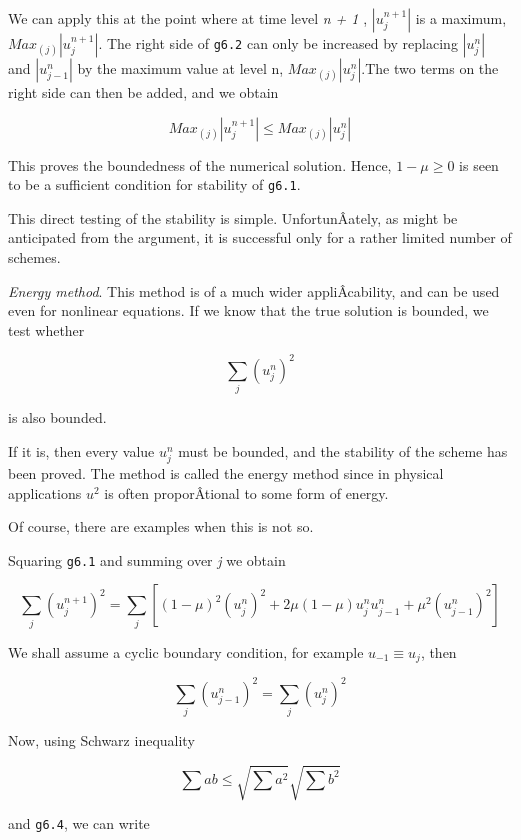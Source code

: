 We can apply this at the point where at time level \emph{n + 1} ,
\(\left| u_{j}^{n + 1} \right|\) is a maximum,
\({Max}_{(j)} \left | u_{j}^{n + 1} \right|\). The right side of
\texttt{g6.2} can only be increased by replacing
\(\left| u_{j}^{n} \right|\) and \(\left| u_{j-1}^{n} \right|\) by the
maximum value at level n, \({Max}_{(j)} \left| u_{j}^{n} \right|\).The
two terms on the right side can then be added, and we obtain

\[{Max}_{(j)} \left| u_{j}^{n + 1} \right| \leq {Max}_{(j)}\left| u_{j}^{n} \right|\]

This proves the boundedness of the numerical solution. Hence,
\(1 - \mu \geq 0\) is seen to be a sufficient condition for stability of
\texttt{g6.1}.

This direct testing of the stability is simple. UnfortunÂ­ately, as might
be anticipated from the argument, it is successful only for a rather
limited number of schemes.

\emph{Energy method}. This method is of a much wider appliÂ­cability, and
can be used even for nonlinear equations. If we know that the true
solution is bounded, we test whether

\[{\sum_{j}^{}\left( u_{j}^{n} \right)}^{2}\]

is also bounded.

If it is, then every value \(u_{j}^{n}\) must be bounded, and the
stability of the scheme has been proved. The method is called the energy
method since in physical applications \(u^{2}\) is often proporÂ­tional
to some form of energy.

Of course, there are examples when this is not so.

Squaring \texttt{g6.1} and summing over \emph{j} we obtain

    \[{\sum_{j}^{}\left( u_{j}^{n + 1} \right)}^{2} =
\sum_{j}^{}\left\lbrack \left( 1 - \mu \right)^{2}\left( u_{j}^{n} \right)^{2} +
2\mu\left( 1 - \mu \right)u_{j}^{n}u_{j - 1}^{n} + \mu^{2}\left( u_{j - 1}^{n} \right)^{2} \right\rbrack\]

We shall assume a cyclic boundary condition, for example
\(u_{- 1} \equiv u_{j}\), then

    \[{\sum_{j}^{}\left( u_{j - 1}^{n} \right)}^{2} =  {\sum_{j}^{}\left( u_{j}^{n} \right)}^{2}\]

Now, using Schwarz inequality

\[\sum_{}^{}{ab \leq \sqrt{\sum_{}^{}a^{2}}}\sqrt{\sum_{}^{}b^{2}}\]

and \texttt{g6.4}, we can write

